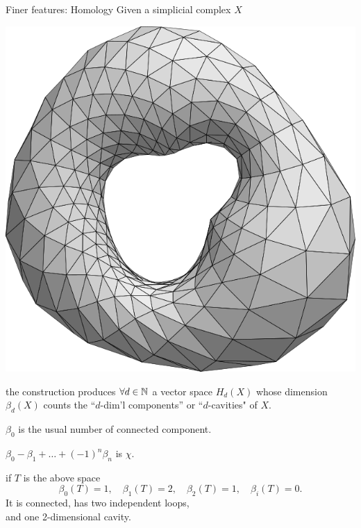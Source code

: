 \begin{frame}{Finer features: Homology}
	\pause
	Given a simplicial complex $X$
	\begin{center}
		\includegraphics[scale=.1]{aux/torus_triangulated}
	\end{center}
	the  construction produces $\forall d \in \mathbb{N}$ a vector space $H_d(X)$ whose dimension $\beta_d(X)$ counts the ``$d$-dim'l components'' or ``$d$-cavities" of $X$.

	\pause\medskip
	 $\beta_0$ is the usual number of connected component.

	\pause\smallskip
	 $\beta_0 - \beta_1 + \dots + (-1)^n \beta_n$ is $\chi$.

	\pause\medskip
	 if $T$ is the above space
	\[
	\beta_0(T) = 1, \quad \beta_1(T) = 2, \quad \beta_2(T) = 1, \quad \beta_i(T) = 0.
	\]
	It is connected, has two independent loops, \\
	and one 2-dimensional cavity.
\end{frame}

